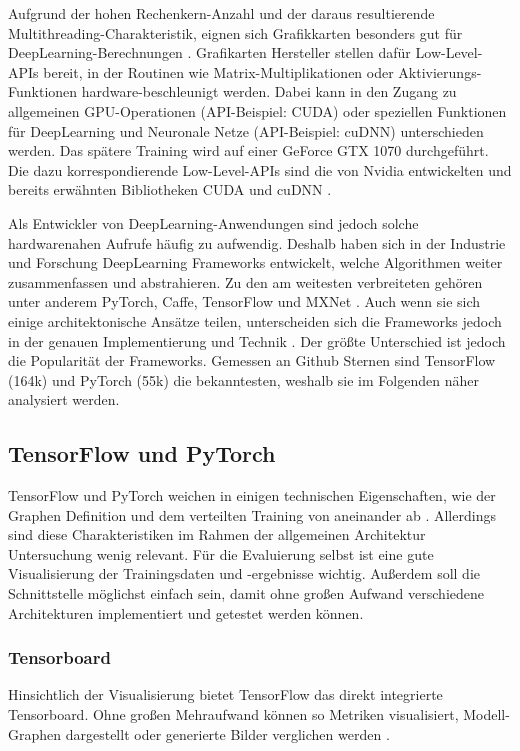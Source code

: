 Aufgrund der hohen Rechenkern-Anzahl und der daraus resultierende Multithreading-Charakteristik, eignen sich Grafikkarten besonders gut für DeepLearning-Berechnungen \cite{gpu-for-dl}.
Grafikarten Hersteller stellen dafür Low-Level-APIs bereit, in der Routinen wie Matrix-Multiplikationen oder Aktivierungs-Funktionen hardware-beschleunigt werden.
Dabei kann in den Zugang zu allgemeinen GPU-Operationen (API-Beispiel: CUDA) oder speziellen Funktionen für DeepLearning und Neuronale Netze (API-Beispiel: cuDNN) unterschieden werden.
Das spätere Training wird auf einer GeForce GTX 1070 \cite{gtx-1070} durchgeführt.
Die dazu korrespondierende Low-Level-APIs sind die von Nvidia entwickelten und bereits erwähnten Bibliotheken CUDA \cite{cuda-doc} und cuDNN \cite{cudnn-doc}.  
\newline

Als Entwickler von DeepLearning-Anwendungen sind jedoch solche hardwarenahen Aufrufe häufig zu aufwendig.
Deshalb haben sich in der Industrie und Forschung DeepLearning Frameworks entwickelt, welche Algorithmen weiter zusammenfassen und abstrahieren.
Zu den am weitesten verbreiteten gehören unter anderem PyTorch, Caffe, TensorFlow und MXNet \cite[S. 2018]{dl-framework-evaluation}. 
Auch wenn sie sich einige architektonische Ansätze teilen, unterscheiden sich die Frameworks jedoch in der genauen Implementierung und Technik \cite[S. 2018, 2020]{dl-framework-evaluation}.
Der größte Unterschied ist jedoch die Popularität der Frameworks.
Gemessen an Github Sternen sind TensorFlow (164k) \cite{github-tensorflow} und PyTorch (55k) \cite{github-pytorch} die bekanntesten, weshalb sie im Folgenden näher analysiert werden.
 
\subsection{TensorFlow und PyTorch}
TensorFlow und PyTorch weichen in einigen technischen Eigenschaften, wie der Graphen Definition und dem verteilten Training von aneinander ab \cite{pytorch-vs-tensorflow}.
Allerdings sind diese Charakteristiken im Rahmen der allgemeinen Architektur Untersuchung wenig relevant.
Für die Evaluierung selbst ist eine gute Visualisierung der Trainingsdaten und -ergebnisse wichtig.
Außerdem soll die Schnittstelle möglichst einfach sein, damit ohne großen Aufwand verschiedene Architekturen implementiert und getestet werden können.

\subsubsection{Tensorboard}
Hinsichtlich der Visualisierung bietet TensorFlow das direkt integrierte Tensorboard.
Ohne großen Mehraufwand können so Metriken visualisiert, Modell-Graphen dargestellt oder generierte Bilder verglichen werden \cite{tensorboard}.

